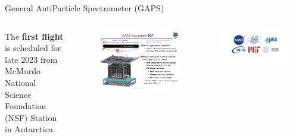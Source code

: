\documentclass[aspectratio=169,xcolor=dvipsnames,handout]{beamer} %
\begin{document}
\begin{frame}{General AntiParticle Spectrometer (GAPS)}
\begin{columns}
        \vspace{0.2cm}
        The \textbf{first flight} is scheduled for late 2023 from McMurdo National Science Foundation (NSF) Station in Antarctica
        
        \begin{figure}
        \centering
        \includegraphics[width=0.95\textwidth]{images/experiment_intro/tracker_menjiao.pdf}
        \end{figure}
        \centering
        \includegraphics[width=0.8\textwidth]{images/logos/loghi_presentazione.pdf}
    \end{columns}
\end{frame}


\end{document}
